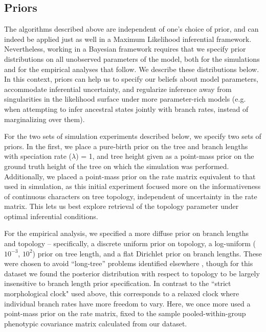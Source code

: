 \documentclass[10pt, twocolumn, twoside]{article}
\begin{document}
\subsection{Priors}

The algorithms described above are independent of one's choice of prior, and can indeed be applied just as well in a Maximum Likelihood inferential framework. Nevertheless, working in a Bayesian framework requires that we specify prior distributions on all unobserved parameters of the model, both for the simulations and for the empirical analyses that follow. We describe these distributions below. In this context, priors can help us to specify our beliefs about model parameters, accommodate inferential uncertainty, and regularize inference away from singularities in the likelihood surface under more parameter-rich models (e.g. when attempting to infer ancestral states jointly with branch rates, instead of marginalizing over them).

For the two sets of simulation experiments described below, we specify two sets of priors. In the first, we place a pure-birth \citep{yuleMathematicalTheoryEvolution1925} prior on the tree and branch lengths with speciation rate ($\lambda$) = 1, and tree height given as a point-mass prior on the ground truth height of the tree on which the simulation was performed. Additionally, we placed a point-mass prior on the rate matrix equivalent to that used in simulation, as this initial experiment focused more on the informativeness of continuous characters on tree topology, independent of uncertainty in the rate matrix. This lets us best explore retrieval of the topology parameter under optimal inferential conditions.

For the empirical analysis, we specified a more diffuse prior on branch lengths and topology – specifically, a discrete uniform prior on topology, a log-uniform ($10^{-3}$, $10^2$) prior on tree length, and a flat Dirichlet prior on branch lengths. These were chosen to avoid “long-tree” problems identified elsewhere \citep{brownWhenTreesGrow2009}, though for this dataset we found the posterior distribution with respect to topology to be largely insensitive to branch length prior specification. In contrast to the ``strict morphological clock" used above, this corresponds to a relaxed clock where individual branch rates have more freedom to vary. Here, we once more used a point-mass prior on the rate matrix, fixed to the sample pooled-within-group phenotypic covariance matrix calculated from our dataset. 
\end{document}
